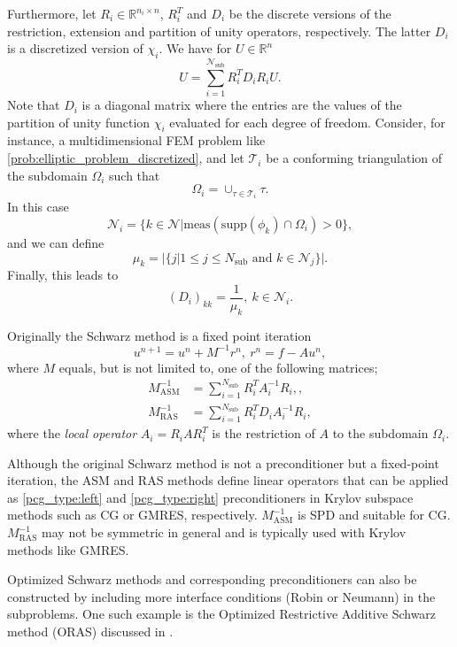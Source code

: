Furthermore, let $R_i\in\mathbb{R}^{n_i \times n}$, $R_i^T$ and $D_i$ be the discrete versions of the restriction, extension and partition of unity operators, respectively. The latter $D_i$ is a discretized version of $\chi_i$. We have for $U \in \mathbb{R}^{n}$
\[
  U = \sum_{i=1}^{\mathcal{N}_{\text{sub}}} R_i^T D_i R_i U.
\]
Note that $D_i$ is a diagonal matrix where the entries are the values of the partition of unity function $\chi_i$ evaluated for each degree of freedom. Consider, for instance, a multidimensional FEM problem like \cref{prob:elliptic_problem_discretized}, and let $\mathcal{T}_i$ be a conforming triangulation of the subdomain $\Omega_i$ such that
\[
  \Omega_i = \cup_{\tau \in \mathcal{T}_i} \tau.
\]
In this case
\[
  \mathcal{N}_i = \{k\in\mathcal{N}| \text{meas}(\text{supp}(\phi_k)\cap\Omega_i)>0\},
\]
and we can define
\[
  \mu_k = |\{j| 1\leq j \leq N_{\text{sub}} \text{ and } k\in\mathcal{N}_j\}|.
\]
Finally, this leads to
\begin{equation}
  (D_i)_{kk} = \frac{1}{\mu_k}, \ k \in \mathcal{N}_i.
  \label{eq:schwarz_partition_of_unity_FEM}
\end{equation}

Originally the Schwarz method is a fixed point iteration \cite[Definitions 1.12 and 1.13]{schwarz_methods_Dolean_2015}
\[
  u^{n+1} = u^n + M^{-1}r^n, \ r^n = f - A u^n,
\]
where $M$ equals, but is not limited to, one of the following matrices;
\begin{subequations}
  \begin{align}
    M^{-1}_{\text{ASM}} & = \sum_{i=1}^{N_{\text{sub}}} R_i^T A_i^{-1} R_i, \label{eq:ASM_preconditioner},    \\
    M^{-1}_{\text{RAS}} & = \sum_{i=1}^{N_{\text{sub}}} R_i^T D_i A_i^{-1} R_i \label{eq:RAS_preconditioner},
  \end{align}
\end{subequations}
where the \textit{local operator} $A_i = R_i A R_i^T$ is the restriction of $A$ to the subdomain $\Omega_i$.

Although the original Schwarz method is not a preconditioner but a fixed-point iteration, the ASM and RAS methods define linear operators that can be applied as \ref{pcg_type:left} and \ref{pcg_type:right} preconditioners in Krylov subspace methods such as CG or GMRES, respectively. $M^{-1}_{\text{ASM}}$ is SPD and suitable for CG. $M^{-1}_{\text{RAS}}$ may not be symmetric in general and is typically used with Krylov methods like GMRES.

Optimized Schwarz methods and corresponding preconditioners can also be constructed by including more interface conditions (Robin or Neumann) in the subproblems. One such example is the Optimized Restrictive Additive Schwarz method (ORAS) discussed in \cite[Chapter 2]{schwarz_methods_Dolean_2015}.

